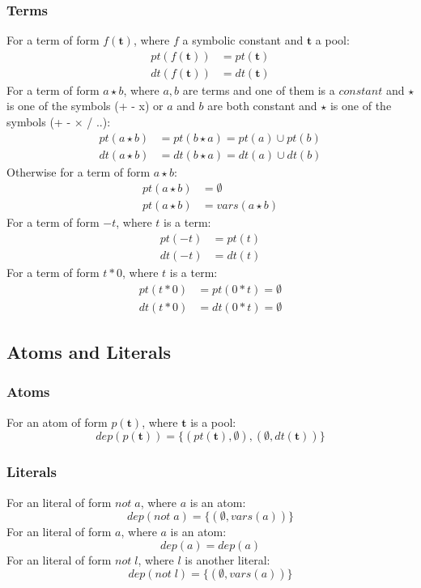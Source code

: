 \documentclass{article}
\newcommand{\pool}[1]{\boldsymbol{#1}}
\newcommand{\set}[1]{\{#1\}}
\newcommand{\dep}[2]{\{(#1), (#2)\}}
\begin{document}
	\subsubsection{Terms}
	For a term of form $f(\pool{t})$, where $f$ a symbolic constant and $\pool{t}$ a pool:
	\begin{align}
		pt(f(\pool{t})) &= pt(\pool{t}) \\
		dt(f(\pool{t})) &= dt(\pool{t})
	\end{align}
	For a term of form $a \star b$, where $a,b$ are terms and one of them is a $\mathit{constant}$ and $\star$ is one of the symbols (+ - x) or $a$ and $b$ are both constant and $\star$ is one of the symbols (+ - × / ..):
	\begin{align}
		pt(a \star b) &= pt(b \star a) = pt(a) \cup pt(b) \\
		dt(a \star b) &= dt(b \star a) = dt(a) \cup dt(b)
	\end{align}
	Otherwise for a term of form $a \star b$:
	\begin{align}
		pt(a \star b) &= \emptyset \\
		pt(a \star b) &= vars(a \star b)
	\end{align}
	For a term of form $-t$, where $t$ is a term:
	\begin{align}
		pt(-t) &= pt(t) \\
		dt(-t) &= dt(t)
	\end{align}
	For a term of form $t*0$, where $t$ is a term:
	\begin{align}
		pt(t*0) &= pt(0*t) = \emptyset \\
		dt(t*0) &= dt(0*t) = \emptyset
	\end{align}

	\subsection{Atoms and Literals}
	\subsubsection{Atoms}
	For an atom of form $p(\pool{t})$, where $\pool{t}$ is a pool:
	\begin{equation}
		dep(p(\pool{t})) = \dep{pt(\pool{t}), \emptyset}{\emptyset, dt(\pool{t})}
	\end{equation}

	\subsubsection{Literals}
	For an literal of form $not \; a$, where $a$ is an atom:
	\begin{equation}
		dep(not \; a) = \set{(\emptyset, vars(a))}
	\end{equation}
	For an literal of form $a$, where $a$ is an atom:
	\begin{equation}
		dep(a) = dep(a)
	\end{equation}
	For an literal of form $not \; l$, where $l$ is another literal:
	\begin{equation}
		dep(not \; l) = \set{(\emptyset, vars(a))}
	\end{equation}
\end{document}
